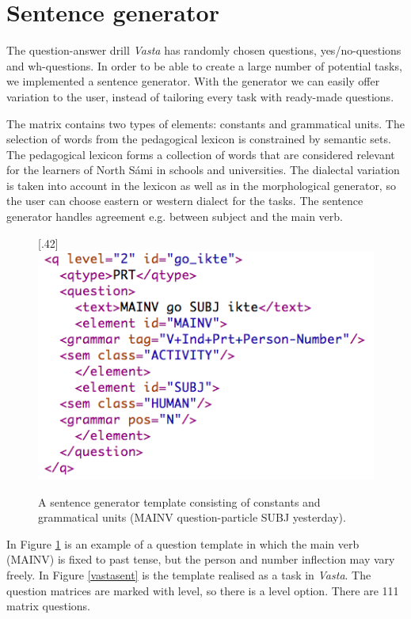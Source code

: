 \documentclass[11pt]{article}
\begin{document}
\section{Sentence generator}
The question-answer drill \textit{Vasta} has randomly chosen questions, yes/no-questions and wh-questions. In order to be able to create a large number of potential tasks, we implemented a sentence generator. With the generator we can easily offer variation to the user, instead of tailoring every task with ready-made questions.

The matrix contains two types of elements: constants and grammatical units. The selection of words from the pedagogical lexicon is constrained by semantic sets. The pedagogical lexicon forms a collection of words that are considered relevant for the learners of North Sámi in schools and universities. The dialectal variation is taken into account in the lexicon as well as in the morphological generator, so the user can choose eastern or western dialect for the tasks. The sentence generator handles agreement e.g. between subject and the main verb. 

\begin{figure}%
\begin{center}
\scalebox{.42}[.42]{\includegraphics{presentation/img/sentencegenerator.png}}\\
\caption{A sentence generator template consisting of constants and grammatical units (MAINV question-particle SUBJ yesterday).}
\label{sentgen}
\end{center}
\end{figure}

In Figure \ref{sentgen} is an example of a question template in which the main verb (MAINV) is fixed to past tense, but the person and number inflection may vary freely. In Figure \ref{vastasent} is the template realised as a task in \textit{Vasta}. The question matrices are marked with level, so there is a level option. There are 111 matrix questions.
\end{document}
